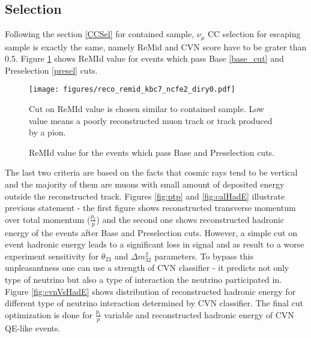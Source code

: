 \subsection{Selection}
Following the section \ref{CCSel} for contained sample, $\nu_\mu$ CC selection for escaping sample is exactly 
the same, namely ReMid and CVN score have to be grater than 0.5. Figure \ref{fig:remid} shows ReMId value for
events which pass Base \ref{base_cut} and Preselection \ref{presel} cuts. 
\begin{figure}[h]
\centering
\texttt{[image: figures/reco\_remid\_kbc7\_ncfe2\_diry0.pdf]}
\caption{ReMId value for the events which pass Base and Preselection cuts.}
{Cut on ReMId value is chosen similar to contained sample. Low value means a poorly reconstructed muon track or
track produced by a pion. }
\label{fig:remid}
\end{figure}

The last two criteria are based on the facts that cosmic rays tend to be vertical and the majority of them are 
muons with small amount of deposited energy outside the reconstructed track. Figures \ref{fig:ptp} and \ref{fig:calHadE}
illustrate previous statement - the first figure shows reconstructed transverse momentum over total momentum 
($\frac{p_t}{p}$) and the second one shows reconstructed hadronic energy of the events after Base and Preselection 
cuts. However, a simple cut on event hadronic energy leads to a significant loss in signal and as result to a 
worse experiment sensitivity for $\theta_{23}$ and $\Delta m^2_{32}$ parameters. To bypass this unpleasantness one 
can use a strength of CVN classifier - it predicts not only type of neutrino but also a type of interaction the 
neutrino participated in. Figure \ref{fig:cvnVsHadE} shows distribution of reconstructed hadronic energy for 
different type of neutrino interaction determined by CVN classifier. The final cut optimization is done for 
$\frac{p_t}{p}$ variable and reconstructed hadronic energy of CVN QE-like events.

